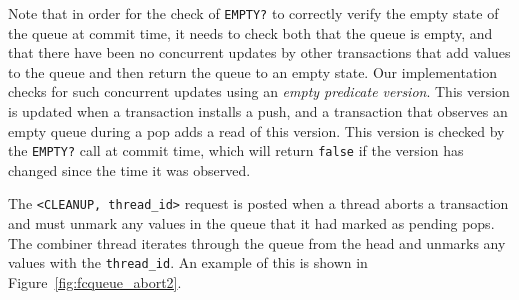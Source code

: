 Note that in order for the check of \texttt{EMPTY?} to correctly verify the empty state of the queue at commit time, it needs to check both that the queue is empty, and that there have been no concurrent updates by other transactions that add values to the queue and then return the queue to an empty state. Our implementation checks for such concurrent updates using an \emph{empty predicate version}. This version is updated when a transaction installs a push, and a transaction that observes an empty queue during a pop adds a read of this version. This version is checked by the \texttt{EMPTY?} call at commit time, which will return \texttt{false} if the version has changed since the time it was observed.

The \texttt{<CLEANUP, thread\_id>} request is posted when a thread aborts a transaction and must unmark any values in the queue that it had marked as pending pops. The combiner thread iterates through the queue from the head and unmarks any values with the \texttt{thread\_id}. An example of this is shown in Figure~\ref{fig:fcqueue_abort2}.


